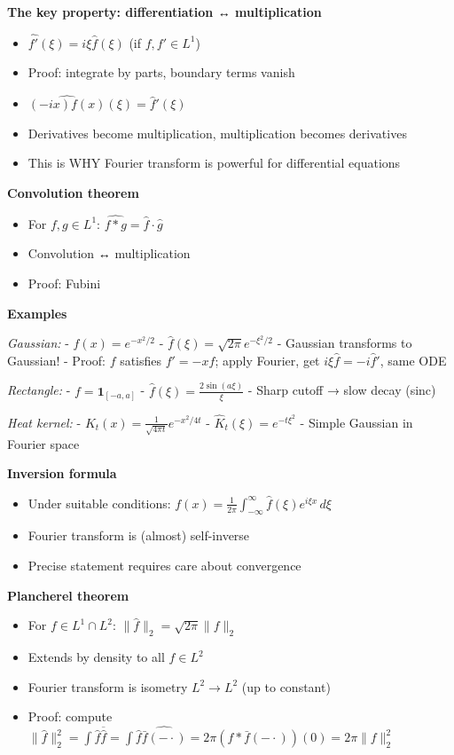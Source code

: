 \documentclass[
  10pt,
  letterpaper,
]{scrbook}
\providecommand{\tightlist}{%
  \setlength{\itemsep}{0pt}\setlength{\parskip}{0pt}}
\begin{document}
\textbf{The key property: differentiation ↔ multiplication}

\begin{itemize}
\tightlist
\item
  \(\widehat{f'}(\xi) = i\xi \hat{f}(\xi)\) (if \(f, f' \in L^1\))
\item
  Proof: integrate by parts, boundary terms vanish
\item
  \(\widehat{(-ix)f(x)}(\xi) = \hat{f}'(\xi)\)
\item
  Derivatives become multiplication, multiplication becomes derivatives
\item
  This is WHY Fourier transform is powerful for differential equations
\end{itemize}

\textbf{Convolution theorem}

\begin{itemize}
\tightlist
\item
  For \(f, g \in L^1\): \(\widehat{f * g} = \hat{f} \cdot \hat{g}\)
\item
  Convolution ↔ multiplication
\item
  Proof: Fubini
\end{itemize}

\textbf{Examples}

\emph{Gaussian:} - \(f(x) = e^{-x^2/2}\) -
\(\hat{f}(\xi) = \sqrt{2\pi} e^{-\xi^2/2}\) - Gaussian transforms to
Gaussian! - Proof: \(f\) satisfies \(f' = -xf\); apply Fourier, get
\(i\xi\hat{f} = -i\hat{f}'\), same ODE

\emph{Rectangle:} - \(f = \mathbf{1}_{[-a,a]}\) -
\(\hat{f}(\xi) = \frac{2\sin(a\xi)}{\xi}\) - Sharp cutoff → slow decay
(sinc)

\emph{Heat kernel:} - \(K_t(x) = \frac{1}{\sqrt{4\pi t}} e^{-x^2/4t}\) -
\(\hat{K}_t(\xi) = e^{-t\xi^2}\) - Simple Gaussian in Fourier space

\textbf{Inversion formula}

\begin{itemize}
\tightlist
\item
  Under suitable conditions:
  \(f(x) = \frac{1}{2\pi}\int_{-\infty}^\infty \hat{f}(\xi) e^{i\xi x}\, d\xi\)
\item
  Fourier transform is (almost) self-inverse
\item
  Precise statement requires care about convergence
\end{itemize}

\textbf{Plancherel theorem}

\begin{itemize}
\tightlist
\item
  For \(f \in L^1 \cap L^2\): \(\|\hat{f}\|_2 = \sqrt{2\pi}\|f\|_2\)
\item
  Extends by density to all \(f \in L^2\)
\item
  Fourier transform is isometry \(L^2 \to L^2\) (up to constant)
\item
  Proof: compute
  \(\|\hat{f}\|_2^2 = \int \hat{f} \overline{\hat{f}} = \int \hat{f} \widehat{\bar{f}(-\cdot)} = 2\pi (f * \bar{f}(-\cdot))(0) = 2\pi \|f\|_2^2\)
\end{itemize}
\end{document}
